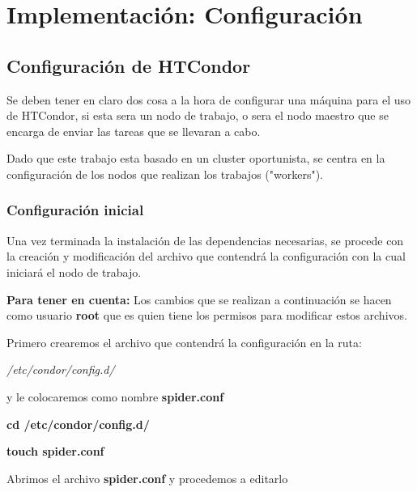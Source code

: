 \chapter{Implementación: Configuración} %

\label{Chapter5} 

\section{Configuración de HTCondor}

Se deben tener en claro dos cosa a la hora de configurar una máquina para el uso de HTCondor, si esta sera un nodo de trabajo, o sera el nodo maestro que se encarga de enviar las tareas que se llevaran a cabo.

Dado que este trabajo esta basado en un cluster oportunista, se centra en la configuración de los nodos que realizan los trabajos ("workers").

\subsection{Configuración inicial}

Una vez terminada la instalación de las dependencias necesarias, se procede con la creación y modificación del archivo que contendrá la configuración con la cual iniciará el nodo de trabajo. 

\textbf{Para tener en cuenta:} Los cambios que se realizan a continuación se hacen como usuario \textbf{root} que es quien tiene los permisos para modificar estos archivos.

Primero crearemos el archivo que contendrá la configuración en la ruta:

\textit{/etc/condor/config.d/}

y le colocaremos como nombre \textbf{spider.conf}

\textbf{cd /etc/condor/config.d/}

\textbf{touch spider.conf}

Abrimos el archivo \textbf{spider.conf} y procedemos a editarlo

